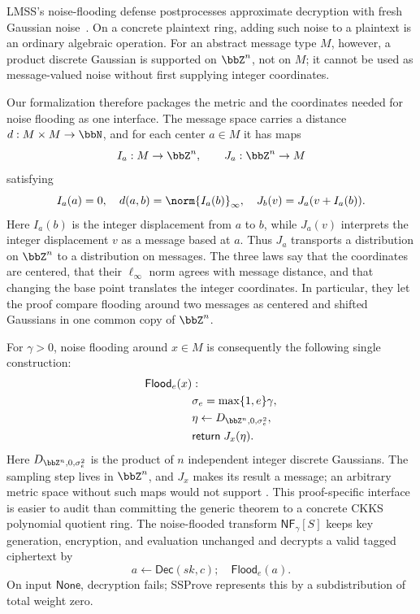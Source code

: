 LMSS's noise-flooding defense postprocesses approximate decryption with fresh
Gaussian noise~\cite{lmss}.
On a concrete plaintext ring, adding such noise to a plaintext is an ordinary
algebraic operation.
For an abstract message type \(M\), however, a product discrete Gaussian is
supported on \(\bbZ^n\), not on \(M\); it cannot be used as message-valued
noise without first supplying integer coordinates.

Our formalization therefore packages the metric and the coordinates needed
for noise flooding as one interface.
The message space carries a distance \(d:M\times M\to\bbN\), and for each
center \(a\in M\) it has maps
\[
 I_a:M\rightarrow\bbZ^n,
 \qquad J_a:\bbZ^n\rightarrow M
\]
satisfying
\begin{equation}
\label{eq:charts}
 I_a(a)=0,
 \quad d(a,b)=\norm{I_a(b)}_\infty,
 \quad J_b(v)=J_a(v+I_a(b)).
\end{equation}
Here \(I_a(b)\) is the integer displacement from \(a\) to \(b\), while
\(J_a(v)\) interprets the integer displacement \(v\) as a message based at
\(a\).
Thus \(J_a\) transports a distribution on \(\bbZ^n\) to a distribution on
messages.
The three laws say that the coordinates are centered, that their
\(\ell_\infty\) norm agrees with message distance, and that changing the base
point translates the integer coordinates.
In particular, they let the proof compare flooding around two messages as
centered and shifted Gaussians in one common copy of \(\bbZ^n\).

For \(\gamma>0\), noise flooding around \(x\in M\) is consequently the
following single construction:
\begin{equation}
\label{eq:flood}
\begin{aligned}
 \mathsf{Flood}_e(x)&:\\
 &\sigma_e=\max\{1,e\}\gamma,\\
 &\eta\leftarrow D_{\bbZ^n,0,\sigma_e^2},\\
 &\mathsf{return}\;J_x(\eta).
\end{aligned}
\end{equation}
Here \(D_{\bbZ^n,0,\sigma_e^2}\) is the product of \(n\) independent
integer discrete Gaussians.
The sampling step lives in \(\bbZ^n\), and \(J_x\) makes its result a message;
an arbitrary metric space without such maps would not support
.
This proof-specific interface is easier to audit than committing the generic
theorem to a concrete CKKS polynomial quotient ring.
The noise-flooded transform \(\mathsf{NF}_{\gamma}[S]\) keeps key generation,
encryption, and evaluation unchanged and decrypts a valid tagged ciphertext by
\[
 a\leftarrow\mathsf{Dec}(sk,c);
 \quad \mathsf{Flood}_e(a).
\]
On input \(\mathsf{None}\), decryption fails; SSProve represents this by a
subdistribution of total weight zero.

